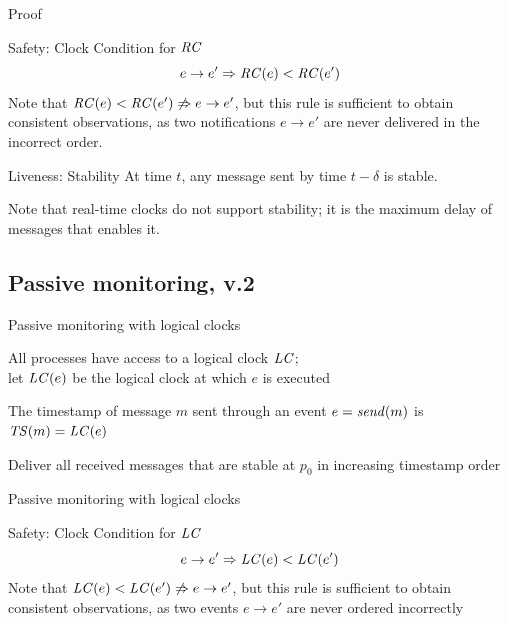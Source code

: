 \begin{frame}{Proof}

\begin{block}{Safety: Clock Condition for $\mathit{RC}$} 
\[
  e \rightarrow e' \Rightarrow \mathit{RC}(e) < \mathit{RC}(e') 
\]
Note that $\mathit{RC}(e) < \mathit{RC}(e') \not\Rightarrow e \rightarrow e'$, but 
this rule is sufficient to obtain consistent observations, as
two notifications $e \rightarrow e'$ are never delivered in the incorrect
order.
\end{block}

\medskip
\begin{block}{Liveness: Stability}
At time $t$, any message sent by time $t-\delta$ is stable.
\end{block}

\medskip
Note that real-time clocks do not support stability; it is the
maximum delay of messages that enables it.
\end{frame}

\subsection{Passive monitoring, v.2}


\begin{frame}{Passive monitoring with logical clocks}

\BI
\item All processes have access to a logical clock $\mathit{LC}$; \\
  let $\mathit{LC}(e)$ be the logical clock at which $e$ is executed
\item The timestamp of message $m$ sent through an event $e = \mathit{send}(m)$
  is $\mathit{TS}(m) = \mathit{LC}(e)$
\EI

\begin{definition}
Deliver all received messages that are stable at $p_0$ in increasing timestamp order
\end{definition}

\end{frame}


\begin{frame}{Passive monitoring with logical clocks}

\begin{block}{Safety: Clock Condition for $\mathit{LC}$} 
\[
e \rightarrow e' \Rightarrow \mathit{LC}(e) < \mathit{LC}(e')
\] 
Note that $\mathit{LC}(e) < \mathit{LC}(e') \not\Rightarrow e \rightarrow e'$, but 
this rule is sufficient to obtain consistent observations, as
two events $e \rightarrow e'$ are never ordered incorrectly
\end{block}

\end{frame}

